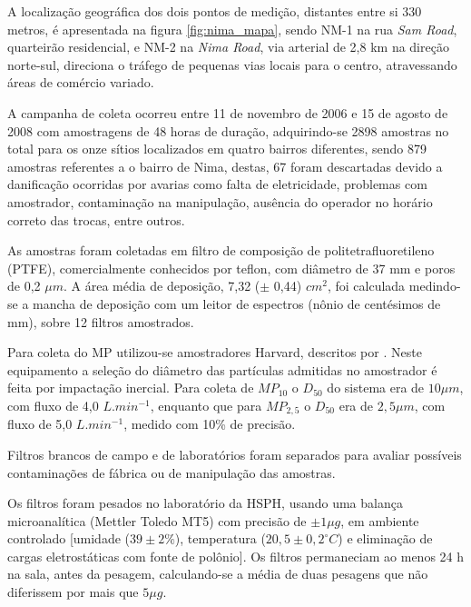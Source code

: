 A localização geográfica dos dois pontos de medição, distantes entre si 330
metros, é apresentada na figura
\ref{fig:nima_mapa}, sendo NM-1 na rua \textit{Sam Road}, quarteirão residencial,
e NM-2 na \textit{Nima Road}, via arterial de 2,8 km na direção norte-sul, 
direciona o tráfego de pequenas vias locais para o centro, atravessando áreas de 
comércio variado. 

A campanha de coleta ocorreu entre 11 de novembro de 2006 e 15 de agosto de 
2008 com amostragens de 48 horas de duração, adquirindo-se 2898 amostras 
no total para os onze sítios localizados em quatro bairros diferentes, 
sendo 879 amostras referentes a o bairro de Nima, destas, 67 foram descartadas
devido a danificação ocorridas por avarias como falta de eletricidade, 
problemas com amostrador, contaminação na manipulação, ausência do 
operador no horário correto das trocas, entre outros.

%    

As amostras foram coletadas em filtro de composição de politetrafluoretileno
(PTFE), comercialmente conhecidos por teflon, com diâmetro de 37 mm e 
poros de 0,2 $\mu m$. A área média de deposição, 7,32 ($\pm$ 0,44) $cm^2$, 
foi calculada medindo-se a mancha de deposição com um leitor de espectros 
(nônio de centésimos de mm), sobre 12 filtros amostrados.

Para coleta do MP utilizou-se amostradores Harvard, descritos por 
\citet{marple1987}. Neste equipamento a seleção do diâmetro das partículas 
admitidas no amostrador é feita por impactação inercial. 
Para coleta de $MP_{10}$ o $D_{50}$ do sistema era de $10 \mu m$, 
com fluxo de 4,0 $L.min^{-1}$, enquanto que para $MP_{2,5}$ o $D_{50}$ 
era de $2,5 \mu m$, com fluxo de 5,0 $L.min^{-1}$, medido com 10\% de precisão. 

Filtros brancos de campo e de laboratórios foram separados para avaliar 
possíveis contaminações de fábrica ou de manipulação das amostras. 

Os filtros foram pesados no laboratório da HSPH, usando uma balança
microanalítica (Mettler Toledo MT5) com precisão de $\pm 1 \mu g$, 
em ambiente controlado [umidade ($39 \pm 2 \%$), 
temperatura ($20,5 \pm 0,2 ^{\circ} C$) e eliminação de cargas eletrostáticas 
com fonte de polônio]. Os filtros permaneciam ao menos 24 h na sala, 
antes da pesagem, calculando-se a média de duas pesagens que não diferissem 
por mais que $5 \mu g$.
